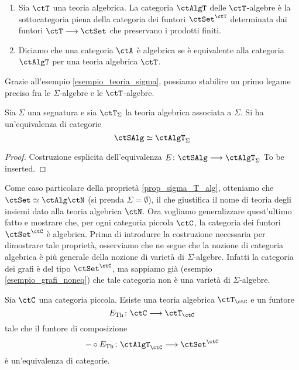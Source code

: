 \begin{definition}\label{def_Talg}
	\hfill
	\begin{enumerate}
		\item Sia \(\ctT\) una teoria algebrica. La categoria \(\ctAlgT\) delle \(\ctT\)-algebre è la sottocategoria piena della categoria dei funtori
		      \(\ctSet^{\ctT}\) determinata dai funtori \(\ctT \fun \ctSet\) che preservano i prodotti finiti.
		\item Diciamo che una categoria \(\ctA\) è algebrica se è equivalente alla categoria \(\ctAlgT\) per una teoria algebrica \(\ctT\).
	\end{enumerate}
\end{definition}

Grazie all'esempio \ref{esempio_teoria_sigma}, possiamo stabilire un primo legame preciso fra le \(\Sigma\)-algebre e le \(\ctT\)-algebre.

\begin{proposition}\label{prop_sigma_T_alg}
	Sia \(\Sigma\) una segnatura e sia \(\ctT_{\Sigma}\) la teoria algebrica associata a \(\Sigma\). Si ha un'equivalenza di categorie
	\[
		\ctSAlg \simeq \ctAlgT_{\Sigma}
	\]
\end{proposition}

\begin{proof}
	Costruzione esplicita dell'equivalenza \(E \colon \ctSAlg \fun \ctAlgT_{\Sigma}\) To be inserted.
\end{proof}

Come caso particolare della proprietà \ref{prop_sigma_T_alg}, otteniamo che \(\ctSet \simeq \ctAlg\ctN\) (si prenda \(\Sigma = \emptyset\)),
il che giustifica il nome di teoria degli insiemi dato alla teoria algebrica \(\ctN\). Ora vogliamo generalizzare quest'ultimo fatto e mostrare che,
per ogni categoria piccola \(\ctC\), la categoria dei funtori \(\ctSet^{\ctC}\) è algebrica. Prima di introdurre la costruzione necessaria per
dimostrare tale proprietà, osserviamo che ne segue che la nozione di categoria algebrica è più generale della nozione di varietà di
\(\Sigma\)-algebre. Infatti la categoria dei grafi è del tipo \(\ctSet^{\ctC}\), ma sappiamo già (esempio \ref{esempio_grafi_noneq}) che tale
categoria non è una varietà di \(\Sigma\)-algebre.

\begin{proposition}\label{prop_compl_finprod}
	Sia \(\ctC\) una categoria piccola. Esiste una teoria algebrica \(\ctT_{\ctC}\) e un funtore
	\[
		E_{\mathrm{Th}} \colon \ctC \fun \ctT_{\ctC}
	\]
	tale che il funtore di composizione
	\[
		- \circ E_{\mathrm{Th}} \colon \ctAlgT_{\ctC} \fun \ctSet^{\ctC}
	\]
	è un'equivalenza di categorie.
\end{proposition}

